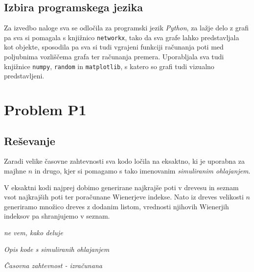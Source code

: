 \documentclass[a4paper, 12 pt]{article}
\begin{document}
\subsection{Izbira programskega jezika}

Za izvedbo naloge sva se odločila za programski jezik \textit{Python}, za lažje delo z grafi pa sva si pomagala s knjižnico \texttt{networkx}, tako da sva grafe lahko predstavljala kot objekte, sposodila pa sva si tudi vgrajeni funkciji računanja poti med poljubnima vozliščema grafa ter računanja premera. Uporabljala sva tudi knjižnice \texttt{numpy}, \texttt{random} in \texttt{matplotlib}, s katero so grafi tudi vizualno predstavljeni.



\pagebreak

\section{Problem P1}

\subsection{Reševanje}

Zaradi velike časovne zahtevnosti sva kodo ločila na eksaktno, ki je uporabna za majhne $n$ in drugo, kjer si pomagamo s tako imenovanim \textit{simuliranim ohlajanjem}.
\vspace{0.5cm}

V eksaktni kodi najprej dobimo generirane najkrajše poti v drevesu in seznam vsot najkrajših poti ter poračunane Wienerjeve indekse. Nato iz dreves velikosti $n$ generiramo množico dreves z dodanim listom, vrednosti njihovih Wienerjih indeksov pa shranjujemo v seznam. 

\textit{ne vem, kako deluje}



\textit{Opis kode s simuliranih ohlajanjem}

\vspace{1cm}

\textit{Časovna zahtevnost - izračunana}
\end{document}
